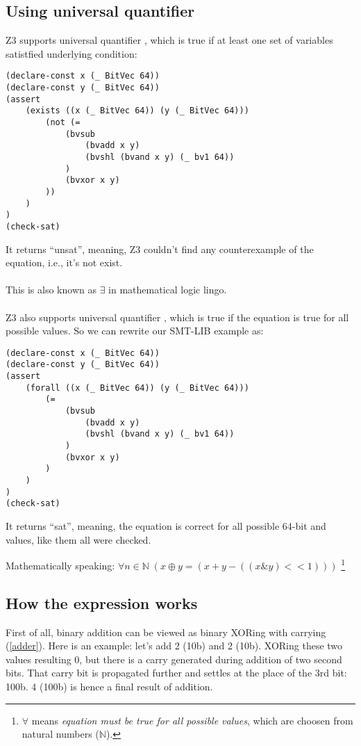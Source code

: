 \subsection{Using universal quantifier}

Z3 supports universal quantifier , which is true
if at least one set of variables satistfied underlying condition:

\begin{lstlisting}
(declare-const x (_ BitVec 64))
(declare-const y (_ BitVec 64))
(assert 
	(exists ((x (_ BitVec 64)) (y (_ BitVec 64)))
		(not (=
			(bvsub 
				(bvadd x y)
				(bvshl (bvand x y) (_ bv1 64))
			)
			(bvxor x y)
		))
	)
)
(check-sat)
\end{lstlisting}

It returns ``unsat'', meaning, Z3 couldn't find any counterexample of the equation, i.e., it's not exist.\\
\\
This is also known as $\exists$ in mathematical logic lingo.\\
\\
Z3 also supports universal quantifier , which is true if the equation is true for all
possible values.
So we can rewrite our SMT-LIB example as:

\begin{lstlisting}
(declare-const x (_ BitVec 64))
(declare-const y (_ BitVec 64))
(assert 
	(forall ((x (_ BitVec 64)) (y (_ BitVec 64)))
		(=
			(bvsub 
				(bvadd x y)
				(bvshl (bvand x y) (_ bv1 64))
			)
			(bvxor x y)
		)
	)
)
(check-sat)
\end{lstlisting}

It returns ``sat'', meaning, the equation is correct for all possible 64-bit  and  values,
like them all were checked.

Mathematically speaking: $\forall n\!\in\!\mathbb{N}\; (x \oplus y = (x + y - ((x \& y)<<1)))$
\footnote{
$\forall$ means \textit{equation must be true for all possible values}, which are choosen from natural numbers ($\mathbb{N}$).}

\subsection{How the expression works}

First of all, binary addition can be viewed as binary XORing with carrying (\ref{adder}).
Here is an example: let's add 2 (10b) and 2 (10b).
XORing these two values resulting 0, but there is a carry generated during addition of two second bits.
That carry bit is propagated further and settles at the place of the 3rd bit: 100b.
4 (100b) is hence a final result of addition.

